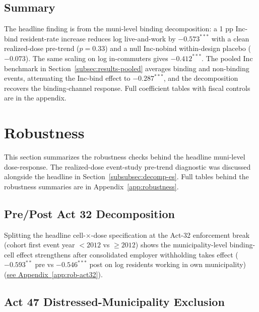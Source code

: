 \documentclass[12pt]{article}
\begin{document}
\subsection{Summary}
\label{subsec:results-summary}

The headline finding is from the muni-level binding decomposition:
a 1 pp Inc-bind resident-rate increase reduces log live-and-work
by $-0.573^{***}$ with a clean realized-dose pre-trend
($p=0.33$) and a null Inc-nobind within-design placebo
($-0.073$). The same scaling on log in-commuters
gives $-0.412^{***}$. The pooled Inc benchmark in
Section~\ref{subsec:results-pooled} averages binding and
non-binding events, attenuating the Inc-bind effect to
$-0.287^{***}$, and the decomposition recovers the binding-channel
response. Full
coefficient tables with fiscal controls are in the appendix.

\section{Robustness}
\label{sec:robustness}

This section summarizes the robustness checks behind the headline
muni-level dose-response. The realized-dose event-study pre-trend
diagnostic was discussed alongside the headline in
Section~\ref{subsubsec:decomp-es}. Full tables behind the
robustness summaries are in Appendix~\ref{app:robustness}.

\subsection{Pre/Post Act 32 Decomposition}
\label{subsec:rob-act32}

Splitting the headline cell-$\times$-dose specification at the Act-32
enforcement break (cohort first event year $<2012$ vs $\geq 2012$)
shows the municipality-level binding-cell effect strengthens after
consolidated employer withholding takes effect ($-0.593^{**}$ pre vs
$-0.546^{***}$ post on log residents working in own municipality)
(\hyperref[app:rob-act32]{see Appendix~\ref{app:rob-act32}}).

\subsection{Act 47 Distressed-Municipality Exclusion}
\label{subsec:rob-act47}
\end{document}
